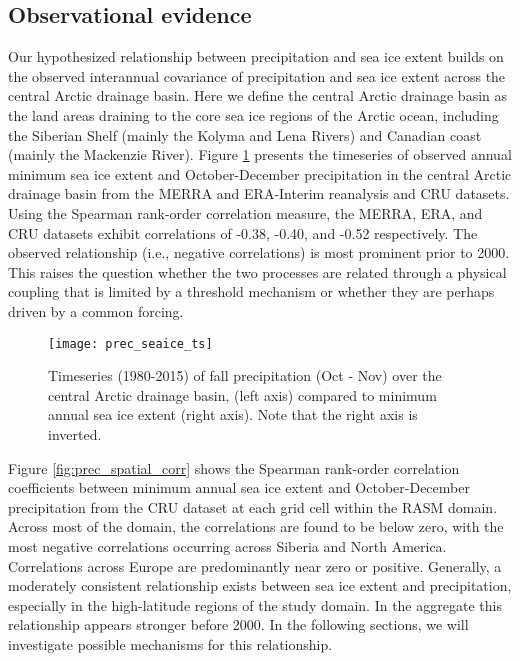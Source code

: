 \subsection{Observational evidence}
Our hypothesized relationship between precipitation and sea ice extent builds on the observed interannual covariance of precipitation and sea ice extent across the central Arctic drainage basin.
Here we define the central Arctic drainage basin as the land areas draining to the core sea ice regions of the Arctic ocean, including the Siberian Shelf (mainly the Kolyma and Lena Rivers) and Canadian coast (mainly the Mackenzie River). %
Figure \ref{fig:prec_ice_ts} presents the timeseries of observed annual minimum sea ice extent and October-December precipitation in the central Arctic drainage basin from the MERRA and ERA-Interim reanalysis and CRU datasets.
Using the Spearman rank-order correlation measure, the MERRA, ERA, and CRU datasets exhibit correlations of -0.38, -0.40, and -0.52 respectively. %
The observed relationship (i.e., negative correlations) is most prominent prior to 2000. %
This raises the question whether the two processes are related through a physical coupling that is limited by a threshold mechanism or whether they are perhaps driven by a common forcing.

\begin{figure}
  \centering
  \texttt{[image: prec\_seaice\_ts]}
  \caption{Timeseries (1980-2015) of fall precipitation (Oct - Nov) over the central Arctic drainage basin, (left axis) compared to minimum annual sea ice extent (right axis). Note that the right axis is inverted.}
  \label{fig:prec_ice_ts}
\end{figure} %

Figure \ref{fig:prec_spatial_corr} shows the Spearman rank-order correlation coefficients between minimum annual sea ice extent and October-December precipitation from the CRU dataset at each grid cell within the RASM domain.
Across most of the domain, the correlations are found to be below zero, with the most negative correlations occurring across Siberia and North America.
Correlations across Europe are predominantly near zero or positive. %
Generally, a moderately consistent relationship exists between sea ice extent and precipitation, especially in the high-latitude regions of the study domain.
In the aggregate this relationship appears stronger before 2000.
In the following sections, we will investigate possible mechanisms for this relationship.

